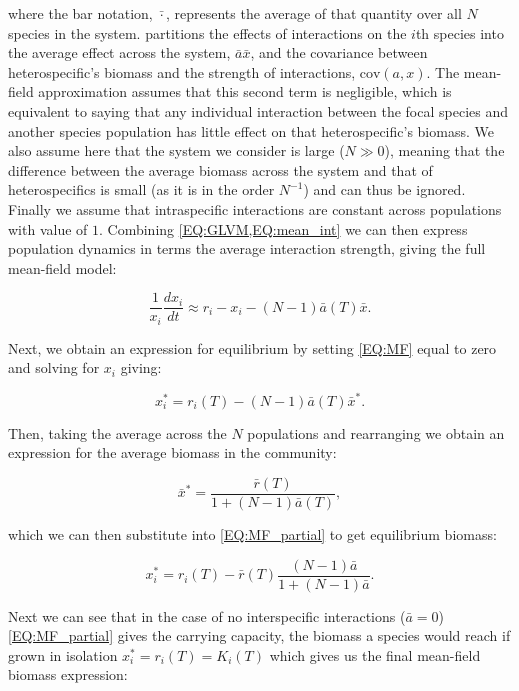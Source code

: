 \documentclass{article}
\begin{document}
where the bar notation, $\bar{\cdot}$, represents the average of that quantity over all $N$ species in the system.  partitions the effects of interactions on the $i$th species into the average effect across the system, $\bar{a} \bar{x}$, and the covariance between heterospecific's biomass and the strength of interactions, $\text{cov}(a,x)$. The mean-field approximation assumes that this second term is negligible, which is equivalent to saying that any individual interaction between the focal species and another species population has little effect on that heterospecific's biomass. We also assume here that the system we consider is large ($N \gg 0$), meaning that the difference between the average biomass across the system and that of heterospecifics is small (as it is in the order $N^{-1}$) and can thus be ignored. Finally we assume that intraspecific interactions are constant across populations with value of $1$. Combining \cref{EQ:GLVM,EQ:mean_int} we can then express population dynamics in terms the average interaction strength, giving the full mean-field model:

\begin{equation} \label{EQ:MF}
    \frac{1}{x_i} \frac{dx_i}{dt} \approx r_i - x_i - (N-1)\bar{a}(T)\bar{x}.
\end{equation}

Next, we obtain an expression for equilibrium by setting \cref{EQ:MF} equal to zero and solving for $x_i$ giving:

\begin{equation} \label{EQ:MF_partial}
    x_i^* = r_i(T) - (N-1)\bar{a}(T)\bar{x}^*.
\end{equation}
 
 Then, taking the average across the $N$ populations and rearranging we obtain an expression for the average biomass in the community:
 
 \begin{equation*}
     \bar{x}^* = \frac{\bar{r}(T)}{1 + (N-1)\bar{a}(T)},
 \end{equation*}
 
 which we can then substitute into \cref{EQ:MF_partial} to get equilibrium biomass:
 
 \begin{equation*}
     x_i^* = r_i(T) - \bar{r}(T) \frac{(N-1) \bar{a}}{1 + (N-1) \bar{a}}.
 \end{equation*}

Next we can see that in the case of no interspecific interactions ($\bar{a} = 0$) \cref{EQ:MF_partial} gives the carrying capacity, the biomass a species would reach if grown in isolation $x_i^* = r_i(T) = K_i(T)$ which gives us the final mean-field biomass expression:
\end{document}
